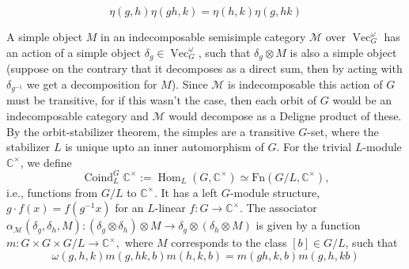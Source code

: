 \documentclass[11pt]{book}
\theoremstyle{Rem}
\theoremstyle{definition}
\numberwithin{equation}{section}
\newcommand\inv{^{-1}}
\newcommand\ot{\otimes}
\newcommand\Coind{\operatorname{Coind}}
\newcommand\Vect{\operatorname{Vec}}
\newcommand\Hom{\operatorname{Hom}}
\newcommand\kk{\mathbb C}
\newcommand\M{\mathcal{M}}
\begin{document}
\begin{equation}
	\eta(g, h)\eta(gh,k) = \eta(h,k)\eta(g, hk)
\end{equation}

A simple object $M$ in an indecomposable semisimple category $\mathcal{M}$ over $\Vect^\omega_G$ has an action of a simple object $\delta_g\in \Vect^\omega_G$, such that $\delta_g \otimes M$ is also a simple object (suppose on the contrary that it decomposes as a direct sum, then by acting with $\delta_{g\inv}$ we get a decomposition for $M$). Since $\M$ is indecomposable this action of $G$ must be transitive, for if this wasn't the case, then each orbit of $G$ would be an indecomposable category and $\M$ would decompose as a Deligne product of these. By the orbit-stabilizer theorem, the simples are a transitive $G$-set, where the stabilizer $L$ is unique upto an inner automorphism of $G$.  For the trivial $L$-module $\kk^\times$, we define
\begin{equation}
	\Coind^G_L \kk^\times := \Hom_L(G,\kk^\times)\simeq \text{Fn}(G/L, \kk^\times),
\end{equation}
i.e., functions from $G/L$ to $\kk^\times$. It has a left $G$-module structure,  $g\cdot f(x) = f(g\inv x)$ for an $L$-linear $f:G\rightarrow \kk^\times$.
The associator  $\alpha_\M (\delta_g,\delta_h,M): (\delta_g\ot \delta_h)\ot M\rightarrow \delta_g\ot (\delta_h\ot M)$  is given by a function $m:G\times G \times G/L\rightarrow \kk^\times,$ where $M$ corresponds to the class $[b]\in G/L$, such that
\begin{equation}\label{pent}
	\omega(g,h,k)m(g, hk, b)m(h, k, b) = m(gh, k, b)m(g, h, kb)
\end{equation}
\end{document}
